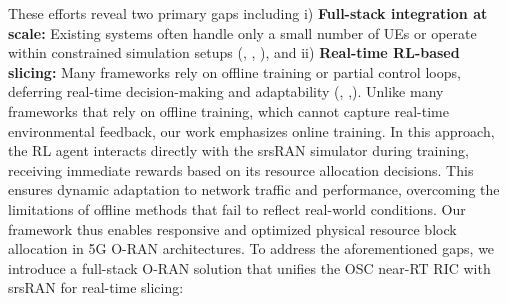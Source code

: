 
These efforts reveal two primary gaps including 
i) \textbf{Full-stack integration at scale:}  Existing systems often handle only a small number of UEs or operate within constrained simulation setups (\cite{marojevic2022actor}, \cite{Colosseum2023}, \cite{Anand2023xApp}), and ii)
 \textbf{Real-time RL-based slicing:} Many frameworks rely on offline training or partial control loops, deferring real-time decision-making and adaptability (\cite{tsampazi2024pandora}, \cite{tsampazi2023},\cite{coloran}). Unlike many frameworks that rely on offline training, which cannot capture real-time environmental feedback, our work emphasizes online training. In this approach, the RL agent interacts directly with the srsRAN simulator during training, receiving immediate rewards based on its resource allocation decisions. This ensures dynamic adaptation to network traffic and performance, overcoming the limitations of offline methods that fail to reflect real-world conditions. Our framework thus enables responsive and optimized physical resource block allocation in 5G O-RAN architectures.
To address the aforementioned gaps, we introduce a full-stack O-RAN solution that unifies the OSC near-RT RIC with srsRAN \cite{srsran} for real-time slicing:

